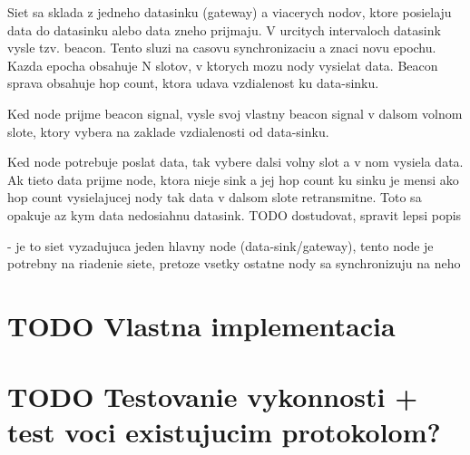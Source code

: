 \documentclass[slovak,master]{diploma}
\begin{document}
Siet sa sklada z jedneho datasinku (gateway) a viacerych nodov, ktore posielaju data do datasinku alebo data zneho prijmaju.
V urcitych intervaloch datasink vysle tzv. beacon. Tento sluzi na casovu synchronizaciu a znaci novu epochu. Kazda epocha obsahuje N 
slotov, v ktorych mozu nody vysielat data. Beacon sprava obsahuje hop count, ktora udava vzdialenost ku data-sinku.

Ked node prijme beacon signal, vysle svoj vlastny beacon signal v dalsom volnom slote, ktory vybera na zaklade vzdialenosti od data-sinku.

Ked node potrebuje poslat data, tak vybere dalsi volny slot a v nom vysiela data. Ak tieto data prijme node, ktora nieje sink a jej hop count ku sinku je mensi ako hop count
vysielajucej nody tak data v dalsom slote retransmitne. Toto sa opakuje az kym data nedosiahnu datasink. TODO dostudovat, spravit lepsi popis

- je to siet vyzadujuca jeden hlavny node (data-sink/gateway), tento node je potrebny na riadenie siete, pretoze vsetky ostatne nody sa synchronizuju na neho



\chapter{TODO Vlastna implementacia}
\chapter{TODO Testovanie vykonnosti + test voci existujucim protokolom?}


\printbibliography[title={Literatura}, heading=bibintoc]

%
%

%
\end{document}
